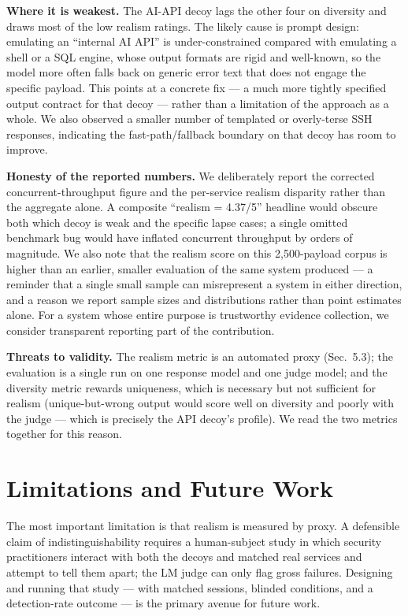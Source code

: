 \documentclass[conference]{IEEEtran}
\begin{document}
\textbf{Where it is weakest.} The AI-API decoy lags the other four on diversity and draws most of the low realism ratings. The likely cause is prompt design: emulating an ``internal AI API'' is under-constrained compared with emulating a shell or a SQL engine, whose output formats are rigid and well-known, so the model more often falls back on generic error text that does not engage the specific payload. This points at a concrete fix --- a much more tightly specified output contract for that decoy --- rather than a limitation of the approach as a whole. We also observed a smaller number of templated or overly-terse SSH responses, indicating the fast-path/fallback boundary on that decoy has room to improve.

\textbf{Honesty of the reported numbers.} We deliberately report the corrected concurrent-throughput figure and the per-service realism disparity rather than the aggregate alone. A composite ``realism = 4.37/5'' headline would obscure both which decoy is weak and the specific lapse cases; a single omitted benchmark bug would have inflated concurrent throughput by orders of magnitude. We also note that the realism score on this 2,500-payload corpus is higher than an earlier, smaller evaluation of the same system produced --- a reminder that a single small sample can misrepresent a system in either direction, and a reason we report sample sizes and distributions rather than point estimates alone. For a system whose entire purpose is trustworthy evidence collection, we consider transparent reporting part of the contribution.

\textbf{Threats to validity.} The realism metric is an automated proxy (Sec.~5.3); the evaluation is a single run on one response model and one judge model; and the diversity metric rewards uniqueness, which is necessary but not sufficient for realism (unique-but-wrong output would score well on diversity and poorly with the judge --- which is precisely the API decoy's profile). We read the two metrics together for this reason.

\section{Limitations and Future Work}

The most important limitation is that realism is measured by proxy. A defensible claim of indistinguishability requires a human-subject study in which security practitioners interact with both the decoys and matched real services and attempt to tell them apart; the LM judge can only flag gross failures. Designing and running that study --- with matched sessions, blinded conditions, and a detection-rate outcome --- is the primary avenue for future work.
\end{document}
